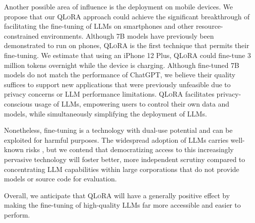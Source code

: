 Another possible area of influence is the deployment on mobile devices. We propose that our \textsc{QLoRA} approach could achieve the significant breakthrough of facilitating the fine-tuning of LLMs on smartphones and other resource-constrained environments. Although 7B models have previously been demonstrated to run on phones, \textsc{QLoRA} is the first technique that permits their fine-tuning. We estimate that using an iPhone 12 Plus, \textsc{QLoRA} could fine-tune 3 million tokens overnight while the device is charging. Although fine-tuned 7B models do not match the performance of ChatGPT, we believe their quality suffices to support new applications that were previously unfeasible due to privacy concerns or LLM performance limitations. \textsc{QLoRA} facilitates privacy-conscious usage of LLMs, empowering users to control their own data and models, while simultaneously simplifying the deployment of LLMs.

Nonetheless, fine-tuning is a technology with dual-use potential and can be exploited for harmful purposes. The widespread adoption of LLMs carries well-known risks \citep{bommasani2021opportunities,bender2021dangers}, but we contend that democratizing access to this increasingly pervasive technology will foster better, more independent scrutiny compared to concentrating LLM capabilities within large corporations that do not provide models or source code for evaluation.

Overall, we anticipate that \textsc{QLoRA} will have a generally positive effect by making the fine-tuning of high-quality LLMs far more accessible and easier to perform.

